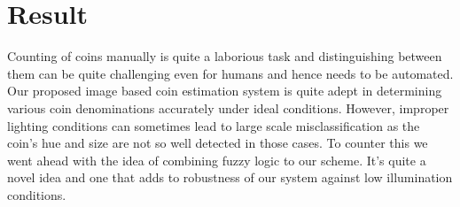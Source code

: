 \documentclass[doc/report.tex]{subfile}
\begin{document}
\section{Result}

Counting of coins manually is quite a laborious task and distinguishing between them can be quite challenging even for humans and hence needs to be automated. Our proposed image based coin estimation system is quite adept in determining various coin denominations accurately under ideal conditions. However, improper lighting conditions can sometimes lead to large scale misclassification as the coin's hue and size are not so well detected in those cases. To counter this we went ahead with the  idea of combining fuzzy logic to our scheme. It's quite a novel idea and one that adds to robustness of our system against low illumination conditions.
\end{document}

